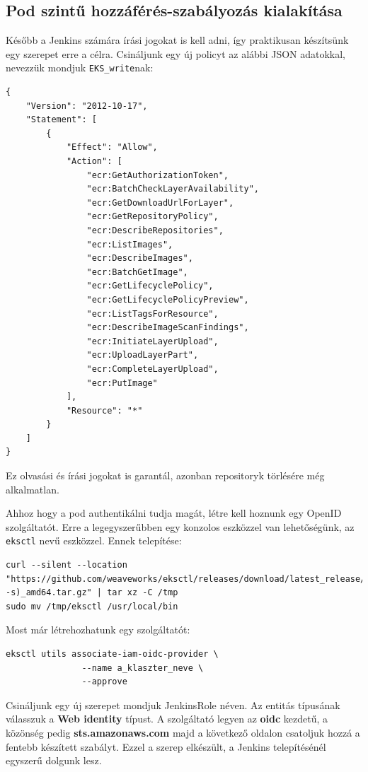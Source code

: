 \subsection{Pod szintű hozzáférés-szabályozás kialakítása}
Később a Jenkins számára írási jogokat is kell adni, így praktikusan készítsünk egy szerepet erre a célra. Csináljunk egy új policyt az alábbi JSON adatokkal, nevezzük mondjuk \lstinline{EKS_write}nak:
\begin{lstlisting}
{
    "Version": "2012-10-17",
    "Statement": [
        {
            "Effect": "Allow",
            "Action": [
                "ecr:GetAuthorizationToken",
                "ecr:BatchCheckLayerAvailability",
                "ecr:GetDownloadUrlForLayer",
                "ecr:GetRepositoryPolicy",
                "ecr:DescribeRepositories",
                "ecr:ListImages",
                "ecr:DescribeImages",
                "ecr:BatchGetImage",
                "ecr:GetLifecyclePolicy",
                "ecr:GetLifecyclePolicyPreview",
                "ecr:ListTagsForResource",
                "ecr:DescribeImageScanFindings",
                "ecr:InitiateLayerUpload",
                "ecr:UploadLayerPart",
                "ecr:CompleteLayerUpload",
                "ecr:PutImage"
            ],
            "Resource": "*"
        }
    ]
}
\end{lstlisting}
Ez olvasási és írási jogokat is garantál, azonban repositoryk törlésére még alkalmatlan.

Ahhoz hogy a pod authentikálni tudja magát, létre kell hoznunk egy OpenID szolgáltatót. Erre a legegyszerűbben egy konzolos eszközzel van lehetőségünk, az \lstinline{eksctl} nevű eszközzel. Ennek telepítése:
\begin{lstlisting}
curl --silent --location "https://github.com/weaveworks/eksctl/releases/download/latest_release/eksctl_$(uname -s)_amd64.tar.gz" | tar xz -C /tmp
sudo mv /tmp/eksctl /usr/local/bin
\end{lstlisting}

Most már létrehozhatunk egy szolgáltatót\cite{OIDC_IAM}:
\begin{lstlisting}
eksctl utils associate-iam-oidc-provider \
               --name a_klaszter_neve \
               --approve
\end{lstlisting}
Csináljunk egy új szerepet mondjuk JenkinsRole néven. Az entitás típusának válasszuk a \textbf{Web identity} típust. A szolgáltató legyen az \textbf{oidc} kezdetű, a közönség pedig \textbf{sts.amazonaws.com} majd a következő oldalon csatoljuk hozzá a fentebb készített szabályt. Ezzel a szerep elkészült, a Jenkins telepítésénél egyszerű dolgunk lesz.
